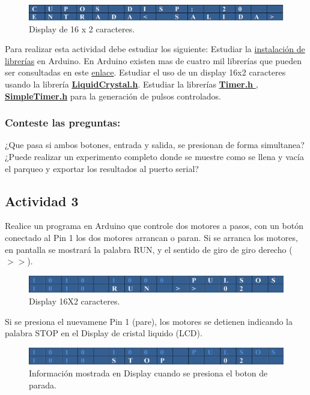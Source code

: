 \begin{figure}
	\centering
	\includegraphics[width=0.7\linewidth]{fig/Dislay.png}
	\caption{Display de 16 x 2 caracteres.}
	\label{fig:dislay}
\end{figure}

Para realizar esta actividad debe estudiar los siguiente:
 Estudiar la \href{https://docs.arduino.cc/software/ide-v1/tutorials/installing-libraries#.Uyd116h5PRk}{instalación de librerías} en Arduino. En Arduino existen mas de cuatro mil librerías que pueden ser consultadas en este \href{https://www.arduino.cc/reference/en/libraries/}{enlace}.
 Estudiar el uso de un display 16x2 caracteres usando la librería \href{http://arduino.cc/en/Tutorial/LiquidCrystalDisplay#.UyPQYfl5OSo }{\textbf{LiquidCrystal.h}}.
 Estudiar la librerías \href{https://github.com/sstaub/Timer}{\textbf{Timer.h }}, \href{https://github.com/kiryanenko/SimpleTimer}{\textbf{SimpleTimer.h}} para la generación de pulsos controlados.
 
\subsubsection{Conteste las preguntas:}

¿Que pasa si ambos botones, entrada y salida, se presionan de forma simultanea?
¿Puede realizar un experimento completo donde se muestre como se llena y vacía el parqueo y exportar los resultados al puerto serial?

\subsection{Actividad 3}

Realice un programa en Arduino que controle dos motores a pasos, con un botón conectado al Pin 1 los dos motores arrancan o paran. Si se arranca los motores, en pantalla se mostrará la palabra RUN, y el sentido de giro  de giro derecho ($>>$).
\begin{figure}[h]
	\centering
	\includegraphics[width=0.7\linewidth]{fig/Fig3.png}
	\caption{Display 16X2 caracteres.}
	\label{fig:fig3}
\end{figure}
Si se presiona el nuevamene Pin 1 (pare), los motores se detienen indicando la palabra STOP en el Display de cristal liquido (LCD).
\begin{figure}[H]
	\centering
	\includegraphics[width=0.7\linewidth]{fig/Fig4.png}
	\caption{Información mostrada en Display cuando se presiona el boton de parada.}
	\label{fig:fig4}
\end{figure}

